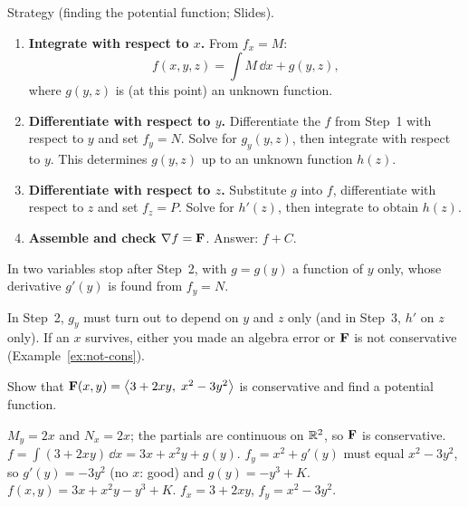 \begin{strategy}{Strategy (finding the potential function; Slides).}
\begin{enumerate}
\item \textbf{Integrate with respect to $x$.} From $f_x=M$:
      \[ f(x,y,z)=\int M\,\dd x+g(y,z), \]
      where $g(y,z)$ is (at this point) an unknown function.
\item \textbf{Differentiate with respect to $y$.} Differentiate the $f$ from
      Step~1 with respect to $y$ and set $f_y=N$. Solve for $g_y(y,z)$, then
      integrate with respect to $y$. This determines $g(y,z)$ up to an unknown
      function $h(z)$.
\item \textbf{Differentiate with respect to $z$.} Substitute $g$ into $f$,
      differentiate with respect to $z$ and set $f_z=P$. Solve for $h'(z)$,
      then integrate to obtain $h(z)$.
\item \textbf{Assemble and check} $\nabla f=\mathbf{F}$. Answer: $f+C$.
\end{enumerate}
In two variables stop after Step~2, with $g=g(y)$ a function of $y$ only, whose
derivative $g'(y)$ is found from $f_y=N$.
\end{strategy}

\begin{remark}
In Step~2, $g_y$ must turn out to depend on $y$ and $z$ only (and in Step~3,
$h'$ on $z$ only). If an $x$ survives, either you made an algebra error or $\mathbf{F}$
is not conservative (Example~\ref{ex:not-cons}).
\end{remark}

\begin{example}\label{ex:pot2d}
Show that $\mathbf{F}(x,y)=\left\langle 3+2xy,\;x^2-3y^2 \right\rangle$ is conservative and find a potential
function.
\end{example}
\begin{solution}
 $M_y=2x$ and $N_x=2x$; the partials are continuous on $\mathbb{R}^2$,
so $\mathbf{F}$ is conservative.
 $f=\int(3+2xy)\,\dd x=3x+x^2y+g(y)$.
 $f_y=x^2+g'(y)$ must equal $x^2-3y^2$, so $g'(y)=-3y^2$ (no
$x$: good) and $g(y)=-y^3+K$.
 $f(x,y)=3x+x^2y-y^3+K$.
 $f_x=3+2xy$\checkok, $f_y=x^2-3y^2$\checkok.
\end{solution}

